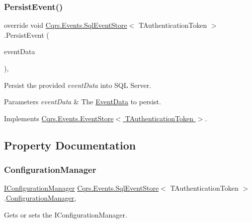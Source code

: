 \subsubsection{\texorpdfstring{Persist\+Event()}{PersistEvent()}}
{\footnotesize\ttfamily override void \hyperlink{classCqrs_1_1Events_1_1SqlEventStore}{Cqrs.\+Events.\+Sql\+Event\+Store}$<$ T\+Authentication\+Token $>$.Persist\+Event (\begin{DoxyParamCaption}\item[{\hyperlink{classCqrs_1_1Events_1_1EventData}{Event\+Data}}]{event\+Data }\end{DoxyParamCaption})\hspace{0.3cm}{\ttfamily [protected]}, {\ttfamily [virtual]}}



Persist the provided {\itshape event\+Data}  into S\+QL Server. 


\begin{DoxyParams}{Parameters}
{\em event\+Data} & The \hyperlink{classCqrs_1_1Events_1_1EventData}{Event\+Data} to persist.\\
\hline
\end{DoxyParams}


Implements \hyperlink{classCqrs_1_1Events_1_1EventStore_aedb71ca0ddf21220e323bc60ad7508cd_aedb71ca0ddf21220e323bc60ad7508cd}{Cqrs.\+Events.\+Event\+Store$<$ T\+Authentication\+Token $>$}.



\subsection{Property Documentation}
\mbox{\label{classCqrs_1_1Events_1_1SqlEventStore_ac74de2a6905b38d167bcb23055e19b3d_ac74de2a6905b38d167bcb23055e19b3d}} 
\subsubsection{\texorpdfstring{Configuration\+Manager}{ConfigurationManager}}
{\footnotesize\ttfamily \hyperlink{interfaceCqrs_1_1Configuration_1_1IConfigurationManager}{I\+Configuration\+Manager} \hyperlink{classCqrs_1_1Events_1_1SqlEventStore}{Cqrs.\+Events.\+Sql\+Event\+Store}$<$ T\+Authentication\+Token $>$.\hyperlink{classCqrs_1_1Configuration_1_1ConfigurationManager}{Configuration\+Manager}\hspace{0.3cm}{\ttfamily [get]}, {\ttfamily [protected]}}



Gets or sets the I\+Configuration\+Manager. 

